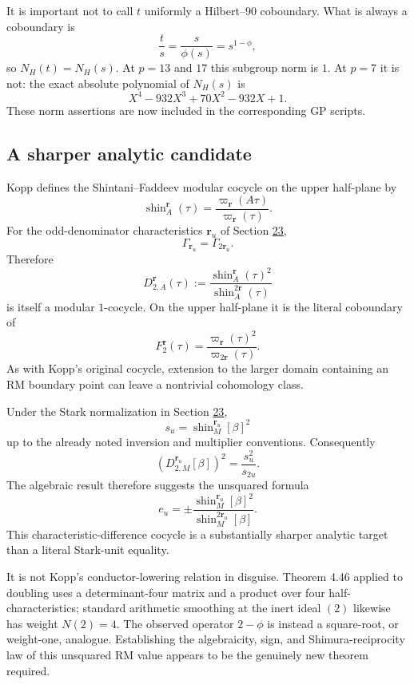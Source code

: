 \documentclass[11pt,reqno]{amsart}
\theoremstyle{plain}
\begin{document}
It is important not to call \(t\) uniformly a Hilbert--90 coboundary. What is always a coboundary is
\[
\frac ts=\frac{s}{\phi(s)}=s^{1-\phi},
\]
so \(N_H(t)=N_H(s)\). At \(p=13\) and \(17\) this subgroup norm is \(1\). At \(p=7\) it is not: the exact absolute polynomial of \(N_H(s)\) is
\[
X^4-932X^3+70X^2-932X+1.
\]
These norm assertions are now included in the corresponding GP scripts.

\subsection{A sharper analytic candidate}\label{sec:27.2}

Kopp defines the Shintani--Faddeev modular cocycle on the upper half-plane by
\[
\operatorname{shin}^{\mathbf r}_{A}(\tau)
=\frac{\varpi_{\mathbf r}(A\tau)}{\varpi_{\mathbf r}(\tau)}.
\]
For the odd-denominator characteristics \(\mathbf r_u\) of Section \hyperref[sec:23]{23},
\[
\Gamma_{\mathbf r_u}=\Gamma_{2\mathbf r_u}.
\]
Therefore
\[
D^{\mathbf r}_{2,A}(\tau)
:=
\frac{\operatorname{shin}^{\mathbf r}_{A}(\tau)^2}
     {\operatorname{shin}^{2\mathbf r}_{A}(\tau)}
\]
is itself a modular \(1\)-cocycle. On the upper half-plane it is the literal coboundary of
\[
F^{\mathbf r}_2(\tau)
=\frac{\varpi_{\mathbf r}(\tau)^2}{\varpi_{2\mathbf r}(\tau)}.
\]
As with Kopp's original cocycle, extension to the larger domain containing an RM boundary point can leave a nontrivial cohomology class.

Under the Stark normalization in Section \hyperref[sec:23]{23},
\[
s_u=\operatorname{shin}^{\mathbf r_u}_{M}[\beta]^2
\]
up to the already noted inversion and multiplier conventions. Consequently
\[
\left(D^{\mathbf r_u}_{2,M}[\beta]\right)^2
=\frac{s_u^2}{s_{2u}}.
\]
The algebraic result therefore suggests the unsquared formula
\[
\boxed{
e_u
=\pm
\frac{\operatorname{shin}^{\mathbf r_u}_{M}[\beta]^2}
     {\operatorname{shin}^{2\mathbf r_u}_{M}[\beta]}.
}
\]
This characteristic-difference cocycle is a substantially sharper analytic target than a literal Stark-unit equality.

It is not Kopp's conductor-lowering relation in disguise. Theorem 4.46 applied to doubling uses a determinant-four matrix and a product over four half-characteristics; standard arithmetic smoothing at the inert ideal \((2)\) likewise has weight \(N(2)=4\). The observed operator \(2-\phi\) is instead a square-root, or weight-one, analogue. Establishing the algebraicity, sign, and Shimura-reciprocity law of this unsquared RM value appears to be the genuinely new theorem required.
\end{document}
